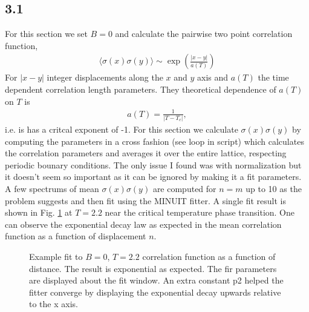 \documentclass[singlepage,notitlepage,nofootinbib,11pt]{revtex4-1}
\begin{document}
\subsection*{3.1}
For this section we set $B=0$ and calculate the pairwise two point correlation function,
\begin{align*}
  \langle \sigma(x)\sigma(y) \rangle \sim \exp\left(\frac{|x-y|}{a(T)}\right)
\end{align*}
For $|x-y|$ integer displacements along the $x$ and $y$ axis and $a(T)$ the time dependent correlation length parameters. They theoretical dependence of $a(T)$ on $T$ is \,
\begin{align*}
  a(T) = \frac{1}{|T-T_c|},
\end{align*}
i.e. is has a critcal exponent of -1. For this section we calculate $\sigma(x)\sigma(y)$ by computing the parameters in a cross fashion (see loop in script) which calculates the correlation parameters and averages it over the entire lattice, respecting periodic bounary conditions. The only issue I found was with normalization but it doesn't seem so important as it can be ignored by making it a fit parameters. A few spectrums of mean $\sigma(x)\sigma(y)$ are computed for $n=m$ up to 10 as the problem suggests and then fit using the MINUIT fitter. A single fit result is shown in Fig. \ref{example} at $T=2.2$ near the critical temperature phase transition. One can observe the exponential decay law as expected in the mean correlation function as a function of displacement $n$.
\begin{figure}[h]
  \centering
  \captionsetup[subfigure]{labelformat=empty}
  \caption{\label{example} Example fit to $B=0$, $T=2.2$ correlation function as a function of distance. The result is exponential as expected. The fir parameters are displayed about the fit window. An extra constant p2 helped the fitter converge by displaying the exponential decay upwards relative to the x axis.}
\end{figure}
\end{document}

